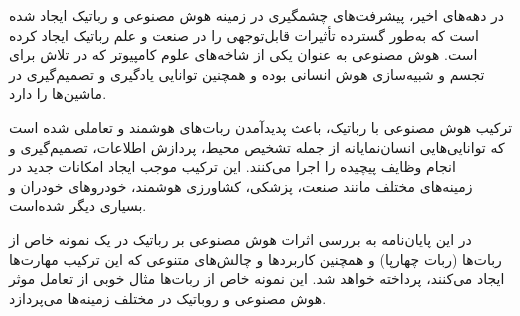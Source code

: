 در دهه‌های اخیر، پیشرفت‌های چشمگیری در زمینه هوش مصنوعی و رباتیک ایجاد شده است که به‌طور گسترده تأثیرات قابل‌توجهی را در صنعت و علم رباتیک ایجاد کرده است. هوش مصنوعی به عنوان یکی از شاخه‌های علوم کامپیوتر که در تلاش برای تجسم و شبیه‌سازی هوش انسانی بوده و همچنین توانایی یادگیری و تصمیم‌گیری در ماشین‌ها را دارد.

ترکیب هوش مصنوعی با رباتیک، باعث پدیدآمدن ربات‌های هوشمند و تعاملی شده است که توانایی‌هایی انسان‌نمایانه از جمله تشخیص محیط، پردازش اطلاعات، تصمیم‌گیری و انجام وظایف پیچیده را اجرا می‌کنند. این ترکیب موجب ایجاد امکانات جدید در زمینه‌های مختلف مانند صنعت، پزشکی، کشاورزی هوشمند، خودروهای خودران و بسیاری دیگر شده‌است.

در این پایان‌نامه به بررسی اثرات هوش مصنوعی بر رباتیک در یک نمونه خاص از ربات‌ها (ربات چهارپا) و همچنین کاربردها و چالش‌های متنوعی که این ترکیب مهارت‌ها ایجاد می‌کنند، پرداخته خواهد شد. این نمونه خاص‌ از ربات‌ها مثال خوبی از تعامل موثر هوش مصنوعی و روباتیک در مختلف زمینه‌ها می‌پردازد.

